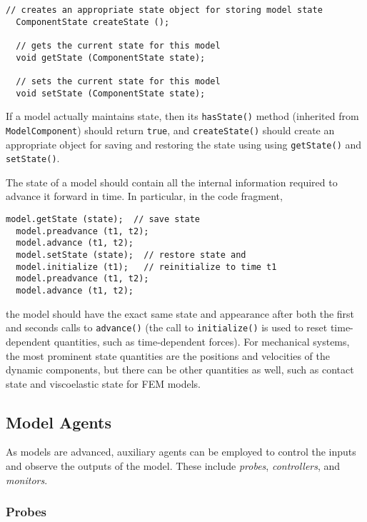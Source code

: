 \documentclass{article}
\begin{document}
\begin{lstlisting}[]
  // creates an appropriate state object for storing model state
  ComponentState createState ();

  // gets the current state for this model
  void getState (ComponentState state);

  // sets the current state for this model
  void setState (ComponentState state);
\end{lstlisting}

If a model actually maintains state, then its {\tt hasState()} method
(inherited from {\tt ModelComponent}) should return {\tt true}, and
{\tt createState()} should create an appropriate object for saving and
restoring the state using using {\tt getState()} and {\tt setState()}.

The state of a model should contain all the internal information
required to advance it forward in time. In particular, in the code
fragment,

\begin{lstlisting}[]
  model.getState (state);  // save state
  model.preadvance (t1, t2);
  model.advance (t1, t2);
  model.setState (state);  // restore state and
  model.initialize (t1);   // reinitialize to time t1
  model.preadvance (t1, t2);
  model.advance (t1, t2);
\end{lstlisting}

the model should have the exact same state and appearance after both
the first and seconds calls to {\tt advance()} (the call to {\tt initialize()} is
used to reset time-dependent quantities, such as time-dependent
forces). For mechanical systems, the most prominent state quantities
are the positions and velocities of the dynamic components, but there
can be other quantities as well, such as contact state and
viscoelastic state for FEM models.
  
\subsection{Model Agents}
\label{ModelAgentsSec}

As models are advanced, auxiliary agents can be employed to control
the inputs and observe the outputs of the model. These include
{\it probes}, {\it controllers}, and {\it monitors}.

\subsubsection{Probes}
\end{document}
